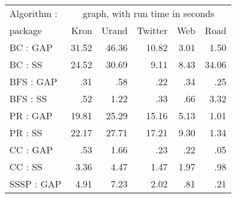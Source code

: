 \begin{table}
\begin{center}
\begin{tabular}{|l|rrrrr|}
\hline
Algorithm :    &   \multicolumn{5}{c|}{graph, with run time in seconds}  \\
 package       &   Kron    &   Urand   &   Twitter  &  Web    &    Road  \\
\hline
BC   : GAP     &  31.52    &  46.36    &  10.82     &  3.01   &    1.50  \\
BC   : SS      &  24.52    &  30.69    &   9.11     &  8.43   &   34.06  \\     %
\hline
BFS  : GAP     &    .31    &    .58    &    .22     &   .34   &     .25  \\
BFS  : SS      &    .52    &   1.22    &    .33     &   .66   &    3.32  \\     %
\hline
PR   : GAP     &  19.81    &  25.29    &  15.16     &  5.13   &    1.01  \\
PR   : SS      &  22.17    &  27.71    &  17.21     &  9.30   &    1.34  \\     %
\hline
CC   : GAP     &    .53    &   1.66    &    .23     &   .22   &     .05  \\
CC   : SS      &   3.36    &   4.47    &   1.47     &  1.97   &     .98  \\     %
\hline
SSSP : GAP     &   4.91    &   7.23    &   2.02     &   .81   &     .21  \\

\end{tabular}
\end{center}
\end{table}

